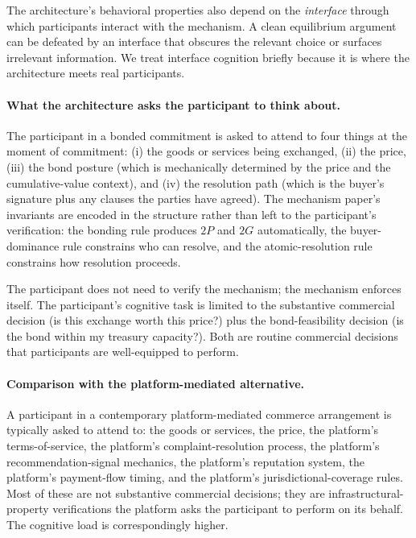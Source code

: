 \documentclass[11pt,a4paper]{article}
\theoremstyle{definition}
\theoremstyle{remark}
\newcommand{\pay}{P}
\newcommand{\cumval}{G}
\begin{document}
The architecture's behavioral properties also depend on the
\emph{interface} through which participants interact with the
mechanism. A clean equilibrium argument can be defeated by an
interface that obscures the relevant choice or surfaces irrelevant
information. We treat interface cognition briefly because it is
where the architecture meets real participants.

\paragraph{What the architecture asks the participant to think about.}
The participant in a bonded commitment is asked to attend to four
things at the moment of commitment: (i) the goods or services
being exchanged, (ii) the price, (iii) the bond posture (which is
mechanically determined by the price and the cumulative-value
context), and (iv) the resolution path (which is the buyer's
signature plus any clauses the parties have agreed). The mechanism
paper's invariants are encoded in the structure rather than left
to the participant's verification: the bonding rule produces
$2\pay$ and $2\cumval$ automatically, the buyer-dominance rule
constrains who can resolve, and the atomic-resolution rule
constrains how resolution proceeds.

The participant does not need to verify the mechanism; the
mechanism enforces itself. The participant's cognitive task is
limited to the substantive commercial decision (is this exchange
worth this price?) plus the bond-feasibility decision (is the bond
within my treasury capacity?). Both are routine commercial
decisions that participants are well-equipped to perform.

\paragraph{Comparison with the platform-mediated alternative.}
A participant in a contemporary platform-mediated commerce
arrangement is typically asked to attend to: the goods or
services, the price, the platform's terms-of-service, the
platform's complaint-resolution process, the platform's
recommendation-signal mechanics, the platform's reputation system,
the platform's payment-flow timing, and the platform's
jurisdictional-coverage rules. Most of these are not substantive
commercial decisions; they are infrastructural-property
verifications the platform asks the participant to perform on its
behalf. The cognitive load is correspondingly higher.
\end{document}
